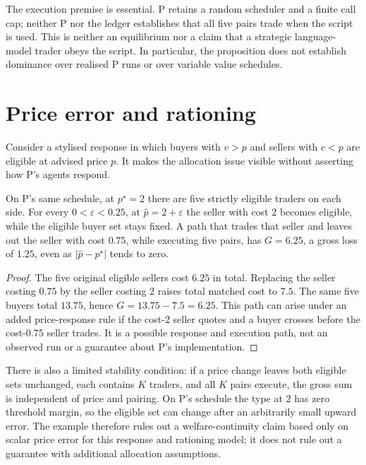 \documentclass{article}
\begin{document}
The execution premise is essential. P retains a random scheduler and a finite call cap; neither P nor the
ledger establishes that all five pairs trade when the script is used. This is neither an equilibrium nor a
claim that a strategic language-model trader obeys the script. In particular, the proposition does not
establish dominance over realised P runs or over variable value schedules.

\section{Price error and rationing}

Consider a stylised response in which buyers with \(v>p\) and sellers with \(c<p\) are eligible at advised
price \(p\). It makes the allocation issue visible without asserting how P's agents respond.

\begin{proposition}
On P's same schedule, at \(p^{\star}=2\) there are five strictly eligible traders on each side. For every
\(0<\varepsilon<0.25\), at \(\hat p=2+\varepsilon\) the seller with cost \(2\) becomes eligible, while the
eligible buyer set stays fixed. A path that trades that seller and leaves out the seller with cost \(0.75\),
while executing five pairs, has \(G=6.25\), a gross loss of \(1.25\), even as \(\lvert\hat
p-p^{\star}\rvert\) tends to zero.
\end{proposition}

\begin{proof}
The five original eligible sellers cost \(6.25\) in total. Replacing the seller costing \(0.75\) by the
seller costing \(2\) raises total matched cost to \(7.5\). The same five buyers total \(13.75\), hence
\(G=13.75-7.5=6.25\). This path can arise under an added price-response rule if the cost-\(2\) seller quotes
and a buyer crosses before the cost-\(0.75\) seller trades. It is a possible response and execution path,
not an observed run or a guarantee about P's implementation.
\end{proof}

There is also a limited stability condition: if a price change leaves both eligible sets unchanged, each
contains \(K\) traders, and all \(K\) pairs execute, the gross sum is independent of price and pairing. On
P's schedule the type at \(2\) has zero threshold margin, so the eligible set can change after an
arbitrarily small upward error. The example therefore rules out a welfare-continuity claim based only on
scalar price error for this response and rationing model; it does not rule out a guarantee with additional
allocation assumptions.
\end{document}
